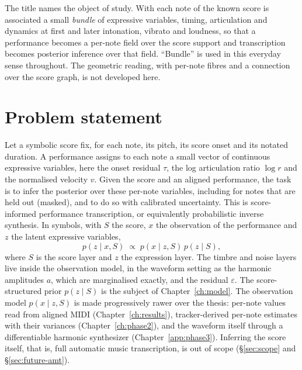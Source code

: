 The title names the object of study. With each note of the known score is
associated a small \emph{bundle} of expressive variables, timing,
articulation and dynamics at first and later intonation, vibrato and
loudness, so that a performance becomes a per-note field over the score
support and transcription becomes posterior inference over that field.
``Bundle'' is used in this everyday sense throughout. The geometric reading,
with per-note fibres and a connection over the score graph, is not developed
here.

\section{Problem statement}
Let a symbolic score fix, for each note, its pitch, its score onset and its
notated duration. A performance assigns to each note a small vector of
continuous expressive variables, here the onset residual $\tau$, the log
articulation ratio $\log r$ and the normalised velocity $v$. Given the score
and an aligned performance, the task is to infer the posterior over these
per-note variables, including for notes that are held out (masked), and to
do so with calibrated uncertainty. This is score-informed performance
transcription, or equivalently probabilistic inverse synthesis. In symbols,
with $S$ the score, $x$ the observation of the performance and $z$ the
latent expressive variables,
\begin{equation*}
  p(z \mid x, S) \;\propto\; p(x \mid z, S)\, p(z \mid S),
\end{equation*}
where $S$ is the score layer and $z$ the expression layer. The timbre and
noise layers live inside the observation model, in the waveform setting as
the harmonic amplitudes $a$, which are marginalised exactly, and the
residual $\varepsilon$. The score-structured prior $p(z \mid S)$ is the
subject of Chapter~\ref{ch:model}. The observation model $p(x \mid z, S)$ is
made progressively rawer over the thesis: per-note values read from aligned
MIDI (Chapter~\ref{ch:results}), tracker-derived per-note estimates with
their variances (Chapter~\ref{ch:phase2}), and the waveform itself through
a differentiable harmonic synthesizer (Chapter~\ref{app:phase3}). Inferring
the score itself, that is, full automatic music transcription, is out of
scope (\S\ref{sec:scope} and \S\ref{sec:future-amt}).

